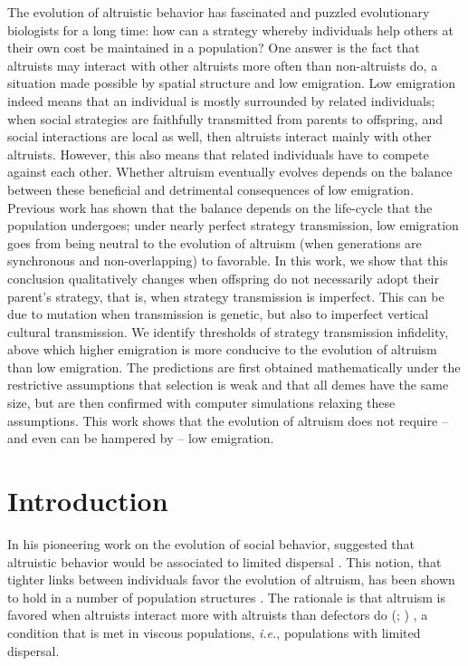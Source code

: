 \documentclass[11pt, letterpaper]{article}
\newcommand{\ie}{\textit{i.e.}}
\newcommand{\eg}{\textit{e.g.}}
\begin{document}
The evolution of altruistic behavior has fascinated and puzzled evolutionary biologists for a long time: how can a strategy whereby individuals help others at their own cost be maintained in a population? One answer is the fact that altruists may interact with other altruists more often than non-altruists do, a situation made possible by spatial structure and low emigration. Low emigration indeed means that an individual is mostly surrounded by related individuals; when social strategies are faithfully transmitted from parents to offspring, and social interactions are local as well, then altruists interact mainly with other altruists. However, this also means that related individuals have to compete against each other. Whether altruism eventually evolves depends on the balance between these beneficial and detrimental consequences of low emigration. Previous work has shown that the balance depends on the life-cycle that the population undergoes; under nearly perfect strategy transmission, low emigration goes from being neutral to the evolution of altruism (when generations are synchronous and non-overlapping) to favorable. In this work, we show that this conclusion qualitatively changes when offspring do not necessarily adopt their parent's strategy, that is, when strategy transmission is imperfect. This can be due to mutation when transmission is genetic, but also to imperfect vertical cultural transmission. We identify thresholds of strategy transmission infidelity, above which higher emigration is more conducive to the evolution of altruism than low emigration. The predictions are first obtained mathematically under the restrictive assumptions that selection is weak and that all demes have the same size, but are then confirmed with computer simulations relaxing these assumptions. This work shows that the evolution of altruism does not require -- and even can be hampered by -- low emigration. 





\clearpage



\section{Introduction}%
In his pioneering work on the evolution of social behavior, \citeauthor{Hamilton1964} suggested that altruistic behavior would be associated to limited dispersal \citep[p.~10]{Hamilton1964}. This notion, that tighter links between individuals favor the evolution of altruism, has been shown to hold in a number of population structures  \citep[see \eg][]{Ohtsuki2006, TaylorDayWild2007, Lehmann2007}. The rationale is that altruism is favored when altruists interact more with altruists than defectors do (\citealp[p.~141]{Hamilton1975}; \citealp{Fletcher2009})%
, a condition that is met in viscous populations, \ie, populations with limited dispersal.
\end{document}
